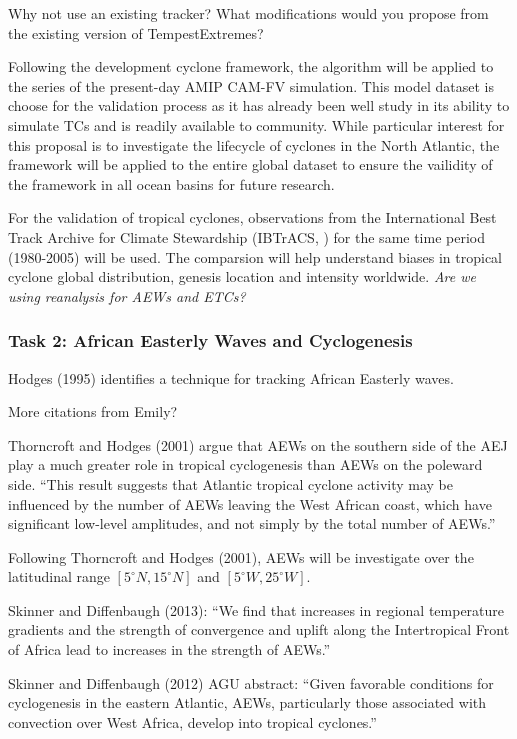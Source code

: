 \documentclass[11pt]{article}
\begin{document}
{\color{red} Why not use an existing tracker?  What modifications would you propose from the existing version of TempestExtremes?}

Following the development cyclone framework, the algorithm will be applied to the series of the present-day AMIP CAM-FV simulation. This model dataset is choose for the validation process as it has already been well study in its ability to simulate TCs \citep{Bacmeister2014,Wehner2014} and is readily available to community. While particular interest for this proposal is to investigate the lifecycle of cyclones in the North Atlantic, the framework will be applied to the entire global dataset to ensure the vailidity of the framework in all ocean basins for future research. 

For the validation of tropical cyclones, observations from the International Best Track Archive for Climate Stewardship (IBTrACS, \citet{Knapp2010}) for the same time period (1980-2005) will be used. The comparsion will help understand biases in tropical cyclone global distribution, genesis location and intensity worldwide. \emph{Are we using reanalysis for AEWs and ETCs?}

\subsubsection{Task 2: African Easterly Waves and Cyclogenesis} 

Hodges (1995) identifies a technique for tracking African Easterly waves.

{\color{red} More citations from Emily?}

Thorncroft and Hodges (2001) argue that AEWs on the southern side of the AEJ play a much greater role in tropical cyclogenesis than AEWs on the poleward side.  ``This result suggests that Atlantic tropical cyclone activity may be influenced by the number of AEWs leaving the West African coast, which have significant low-level amplitudes, and not simply by the total number of AEWs.''

Following Thorncroft and Hodges (2001), AEWs will be investigate over the latitudinal range $[5^\circ N, 15^\circ N]$ and $[5^\circ W, 25^\circ W]$.

Skinner and Diffenbaugh (2013): ``We find that increases in regional temperature gradients and the strength of convergence and uplift along the Intertropical Front of Africa lead to increases in the strength of AEWs.''  

Skinner and Diffenbaugh (2012) AGU abstract: ``Given favorable conditions for cyclogenesis in the eastern Atlantic, AEWs, particularly those associated with convection over West Africa, develop into tropical cyclones.''
\end{document}
